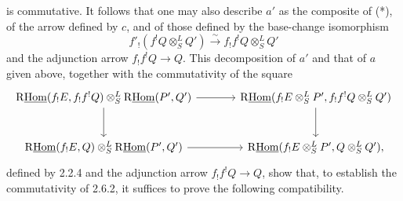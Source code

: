 is commutative. It follows that one may also describe $a'$ as the composite of (*), of the arrow defined by $c$, and of those defined by the base-change isomorphism
\[
f'_!(f^!Q\otimes^L_SQ')\xrightarrow{\sim}f_!f^!Q\otimes^L_SQ'
\]
and the adjunction arrow $f_!f^!Q\to Q$. This decomposition of $a'$ and that of $a$ given above, together with the commutativity of the square
\[
\begin{tikzcd}[column sep=large,row sep=large]
\mathrm{R}\underline{\mathrm{Hom}}(f_!E,f_!f^!Q)\otimes^L_S\mathrm{R}\underline{\mathrm{Hom}}(P',Q') \arrow[r] \arrow[d] & \mathrm{R}\underline{\mathrm{Hom}}(f_!E\otimes^L_SP',f_!f^!Q\otimes^L_SQ') \arrow[d]\\
\mathrm{R}\underline{\mathrm{Hom}}(f_!E,Q)\otimes^L_S\mathrm{R}\underline{\mathrm{Hom}}(P',Q') \arrow[r] & \mathrm{R}\underline{\mathrm{Hom}}(f_!E\otimes^L_SP',Q\otimes^L_SQ'),
\end{tikzcd}
\]
defined by 2.2.4 and the adjunction arrow $f_!f^!Q\to Q$, show that, to establish the commutativity of 2.6.2, it suffices to prove the following compatibility.

